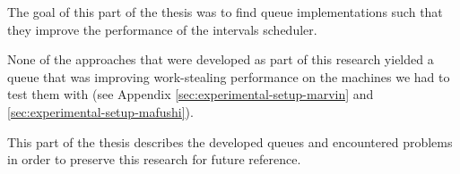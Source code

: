 
The goal of this part of the thesis was to find queue implementations
such that they improve the performance of the intervals scheduler.

None of the approaches that were developed as part of this research
yielded a queue that was improving work-stealing performance on the
machines we had to test them with (see Appendix
\ref{sec:experimental-setup-marvin} and
\ref{sec:experimental-setup-mafushi}).


This part of the thesis describes the developed queues and encountered
problems in order to preserve this research for future reference.


